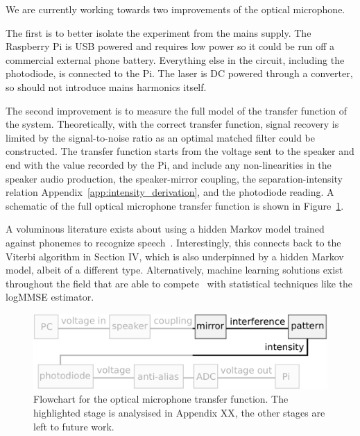 \documentclass[paper-main.tex]{subfiles}
\begin{document}

We are currently working towards two improvements of the optical microphone.


The first is to better isolate the experiment from the mains supply. 
The Raspberry Pi is USB powered and requires low power so it could be run off a commercial external phone battery. 
Everything else in the circuit, including the photodiode, is connected to the Pi. 
The laser is DC powered through a converter, so should not introduce mains harmonics itself. 


The second improvement is to measure the full model of the transfer function of the system. 
Theoretically, with the correct transfer function, signal recovery is limited by the signal-to-noise ratio as an optimal matched filter could be constructed.
The transfer function starts from the voltage sent to the speaker and end with the value recorded by the Pi, and include any non-linearities in the speaker audio production, the speaker-mirror coupling, the separation-intensity relation Appendix~\ref{app:intensity_derivation}, and the photodiode reading. 
A schematic of the full optical microphone transfer function is shown in Figure~\ref{fig:pipeline_highlighted}.

A voluminous literature exists about using a hidden Markov model trained against phonemes to recognize speech~\cite{HMM_english}. 
Interestingly, this connects back to the Viterbi algorithm in Section IV, which is also underpinned by a hidden Markov model, albeit of a different type. 
Alternatively, machine learning solutions exist throughout the field that are able to compete~\cite{SEGAN} with statistical techniques like the logMMSE estimator.



\begin{figure}
	\includegraphics[width=.99\textwidth]{figures/pipeline_highlighted.pdf}
	\caption{
Flowchart for the optical microphone transfer function. 
The highlighted stage is analysised in Appendix XX, the other stages are left to future work. 
}
	\label{fig:pipeline_highlighted}
\end{figure}
\end{document}
